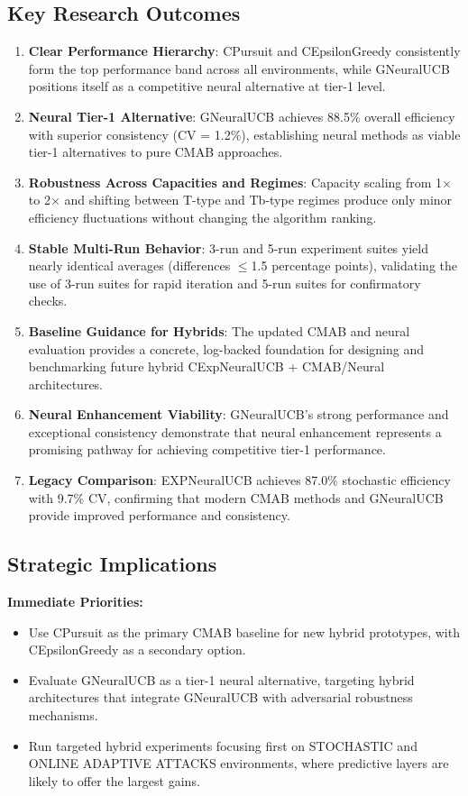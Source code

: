 \documentclass[12pt,a4paper]{article}
\newcommand{\legacy}[1]{\textcolor{legacycolor}{\textbf{#1}}}
\newcommand{\neural}[1]{\textcolor{neuralcolor}{\textbf{#1}}}
\begin{document}
\subsection{Key Research Outcomes}

\begin{enumerate}
\item \textbf{Clear Performance Hierarchy}: CPursuit and CEpsilonGreedy consistently form the top performance band across all environments, while GNeuralUCB positions itself as a competitive neural alternative at tier-1 level.
\item \textbf{Neural Tier-1 Alternative}: GNeuralUCB achieves 88.5\% overall efficiency with superior consistency (CV = 1.2\%), establishing neural methods as viable tier-1 alternatives to pure CMAB approaches.
\item \textbf{Robustness Across Capacities and Regimes}: Capacity scaling from 1$\times$ to 2$\times$ and shifting between T-type and Tb-type regimes produce only minor efficiency fluctuations without changing the algorithm ranking.
\item \textbf{Stable Multi-Run Behavior}: 3-run and 5-run experiment suites yield nearly identical averages (differences $\leq$1.5 percentage points), validating the use of 3-run suites for rapid iteration and 5-run suites for confirmatory checks.
\item \textbf{Baseline Guidance for Hybrids}: The updated CMAB and neural evaluation provides a concrete, log-backed foundation for designing and benchmarking future hybrid CExpNeuralUCB + CMAB/Neural architectures.
\item \neural{Neural Enhancement Viability}: GNeuralUCB's strong performance and exceptional consistency demonstrate that neural enhancement represents a promising pathway for achieving competitive tier-1 performance.
\item \legacy{Legacy Comparison}: EXPNeuralUCB achieves 87.0\% stochastic efficiency with 9.7\% CV, confirming that modern CMAB methods and GNeuralUCB provide improved performance and consistency.
\end{enumerate}

\subsection{Strategic Implications}

\textbf{Immediate Priorities:}
\begin{itemize}
\item Use CPursuit as the primary CMAB baseline for new hybrid prototypes, with CEpsilonGreedy as a secondary option.
\item Evaluate GNeuralUCB as a tier-1 neural alternative, targeting hybrid architectures that integrate GNeuralUCB with adversarial robustness mechanisms.
\item Run targeted hybrid experiments focusing first on STOCHASTIC and ONLINE ADAPTIVE ATTACKS environments, where predictive layers are likely to offer the largest gains.
\end{itemize}
\end{document}
